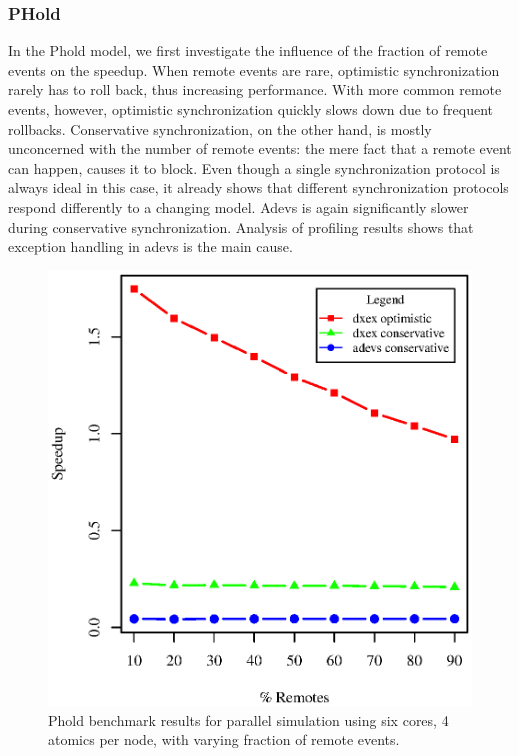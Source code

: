 \subsubsection{PHold}
In the Phold model, we first investigate the influence of the fraction of remote events on the speedup.
When remote events are rare, optimistic synchronization rarely has to roll back, thus increasing performance.
With more common remote events, however, optimistic synchronization quickly slows down due to frequent rollbacks.
Conservative synchronization, on the other hand, is mostly unconcerned with the number of remote events: the mere fact that a remote event can happen, causes it to block.
Even though a single synchronization protocol is always ideal in this case, it already shows that different synchronization protocols respond differently to a changing model.
Adevs is again significantly slower during conservative synchronization.
Analysis of profiling results shows that exception handling in adevs is the main cause. 

\begin{figure}
    \center
    \includegraphics[width=\plotfraction\columnwidth]{fig/phold_speedup_remotes.eps}
    \caption{Phold benchmark results for parallel simulation using six cores, 4 atomics per node, with varying fraction of remote events.}
\end{figure}

